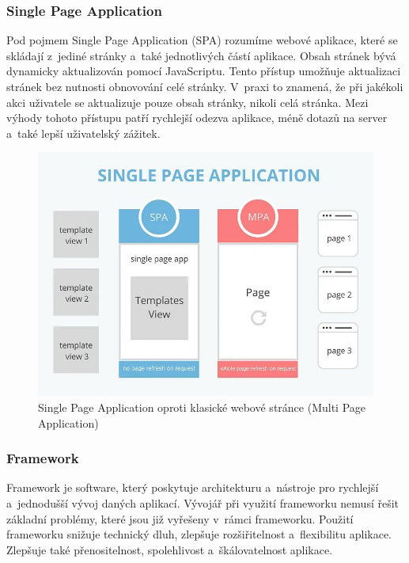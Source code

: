 \subsubsection*{Single Page Application}

Pod pojmem Single Page Application (SPA) rozumíme webové aplikace, které se skládají z~jediné stránky a~také jednotlivých částí aplikace. 
Obsah stránek bývá dynamicky aktualizován pomocí JavaScriptu. Tento přístup umožňuje aktualizaci stránek bez nutnosti obnovování celé stránky. 
V~praxi to znamená, že při jakékoli akci uživatele se aktualizuje pouze obsah stránky, nikoli celá stránka. 
Mezi výhody tohoto přístupu patří rychlejší odezva aplikace, méně dotazů na server a~také lepší uživatelský zážitek.\cite{jadhavspa}

\begin{figure}[htb]
	\centering
		\includegraphics[width=.75\textwidth]{images/SPAvsMPA.jpg}
	\caption[Single Page Application oproti klasické webové stránce (Multi Page Application)]{Single Page Application oproti klasické webové stránce (Multi Page Application) \cite{fergusonspavsmpa}}
	\label{fig:spavsmpa}
\end{figure}

\subsubsection*{Framework}

Framework je software, který poskytuje architekturu a~nástroje pro rychlejší a~jednodušší vývoj daných aplikací. 
Vývojář při využití frameworku nemusí řešit základní problémy, které jsou již vyřešeny v~rámci frameworku. 
Použití frameworku snižuje technický dluh, zlepšuje rozšiřitelnost a~flexibilitu aplikace. 
Zlepšuje také přenositelnost, spolehlivost a~škálovatelnost aplikace.\cite{schmidtframeworks}